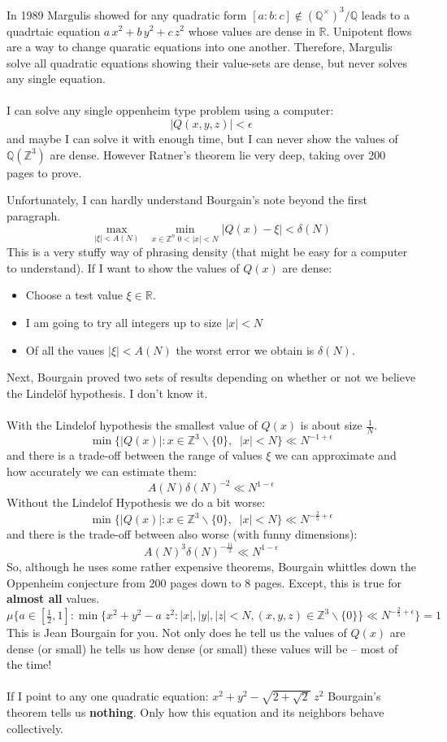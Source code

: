 \documentclass[12pt]{article}
\begin{document}
In 1989 Margulis showed for any quadratic form $[a:b:c] \notin (\mathbb{Q}^\times)^3/\mathbb{Q}$ leads to a quadrtaic equation $a \, x^2 + b\, y^2 + c\, z^2$ whose values are dense in $\mathbb{R}$.  Unipotent flows are a way to change quaratic equations into one another.  Therefore, Margulis solve all quadratic equations showing their value-sets are dense, but never solves any single equation.  \\ \\ 
I can solve any single oppenheim type problem using a computer:
$$ |Q(x,y,z)| < \epsilon $$
and maybe I can solve it with enough time, but I can never show the values of $\mathbb{Q}(\mathbb{Z}^3)$ are dense.  However Ratner's theorem lie very deep, taking over 200 pages to prove.  

\newpage

\noindent Unfortunately, I can hardly understand Bourgain's note beyond the first paragraph.  
$$ \max_{|\xi| < A(N)}\; \;  \min_{x \in \mathbb{Z}^n \; 0 < |x| < N} |Q(x)- \xi| < \delta(N)   $$
This is a very stuffy way of phrasing density (that might be easy for a computer to understand).  If I want to show the values of $Q(x)$ are dense: 
\begin{itemize}
\item Choose a test value $\xi \in \mathbb{R}$.
\item I am going to try all integers up to size $|x| < N$ 
\item Of all the vaues $|\xi| < A(N)$ the worst error we obtain is $\delta(N)$.
\end{itemize}
Next, Bourgain proved two sets of results depending on whether or not we believe the Lindel\"{o}f hypothesis.  I don't know it.  \\ \\
With the Lindelof hypothesis the smallest value of $Q(x)$ is about size $\frac{1}{N}$.
$$ \min  \big\{  |Q(x)| : {x \in \mathbb{Z}^3 \backslash \{ 0\}, \;\;|x| < N}  \big\} \ll N^{-1 + \epsilon} $$
and there is a trade-off between the range of values $\xi$ we can approximate and how accurately we can estimate them:
$$ A(N) \delta(N)^{-2} \ll N^{1-\epsilon} $$
Without the Lindelof Hypothesis we do a bit worse:
$$ \min  \big\{  |Q(x)| : {x \in \mathbb{Z}^3 \backslash \{ 0\}, \;\;|x| < N}  \big\} \ll N^{-\frac{2}{5} + \epsilon} $$
and there is the trade-off between also worse (with funny dimensions):
$$ A(N)^3 \delta(N)^{-\frac{11}{2}} \ll N^{1-\epsilon} $$
So, although he uses some rather expensive theorems, Bourgain whittles down the Oppenheim conjecture from 200 pages down to 8 pages.  Except, this is true for \textbf{almost all} values.  
$$ \mu \Bigg\{  a \in [\tfrac{1}{2},1]: \min \Big\{ x^2 + y^2 - a \; z^2 :  |x|, |y|,|z| < N, (x,y,z) \in \mathbb{Z}^3 \backslash \{ 0\}  \Big\} \ll N^{-\frac{2}{5}+\epsilon} \Bigg\} = 1$$
This is Jean Bourgain for you.  Not only does he tell us the values of $Q(x)$ are dense (or small) he tells us how dense (or small) these values will be -- most of the time! \\ \\
If I point to any one quadratic equation:  $ x^2 + y^2 - \sqrt{2 + \sqrt{2}}\; z^2 $ Bourgain's theorem tells us \textbf{nothing}.  Only how this equation and its neighbors behave collectively.  
\end{document}
